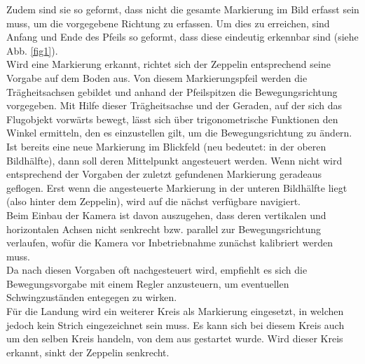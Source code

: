 \documentclass{ezb}
\begin{document}
Zudem sind sie so geformt, dass nicht die gesamte Markierung im Bild erfasst sein muss, um die vorgegebene Richtung zu erfassen. Um dies zu erreichen, sind Anfang und Ende des Pfeils so geformt, dass diese eindeutig erkennbar sind (siehe Abb. \ref{fig1}).\\ 
\linebreak
Wird eine Markierung erkannt, richtet sich der Zeppelin entsprechend seine Vorgabe auf dem Boden aus. Von diesem Markierungspfeil werden die Trägheitsachsen gebildet und anhand der Pfeilspitzen die Bewegungsrichtung vorgegeben. Mit Hilfe dieser Trägheitsachse und der Geraden, auf der sich das Flugobjekt vorwärts bewegt, lässt sich über trigonometrische Funktionen den Winkel ermitteln, den es einzustellen gilt, um die Bewegungsrichtung zu ändern. Ist bereits eine neue Markierung im Blickfeld (neu bedeutet: in der oberen Bildhälfte), dann soll deren Mittelpunkt angesteuert werden. Wenn nicht wird entsprechend der Vorgaben der zuletzt gefundenen Markierung geradeaus geflogen. Erst wenn die angesteuerte Markierung in der unteren Bildhälfte liegt (also hinter dem Zeppelin), wird auf die nächst verfügbare navigiert.\\
\linebreak 
Beim Einbau der Kamera ist davon auszugehen, dass deren vertikalen und horizontalen Achsen nicht senkrecht bzw. parallel zur Bewegungsrichtung verlaufen, wofür die Kamera vor Inbetriebnahme zunächst kalibriert werden muss.\\
\linebreak
Da nach diesen Vorgaben oft nachgesteuert wird, empfiehlt es sich die Bewegungsvorgabe mit einem Regler anzusteuern, um eventuellen Schwingzuständen entegegen zu wirken.    \\ 
\linebreak
Für die Landung wird ein weiterer Kreis als Markierung eingesetzt, in welchen jedoch kein Strich eingezeichnet sein muss. Es kann sich bei diesem Kreis auch um den selben Kreis handeln, von dem aus gestartet wurde. Wird dieser Kreis erkannt, sinkt der Zeppelin senkrecht.
\end{document}
